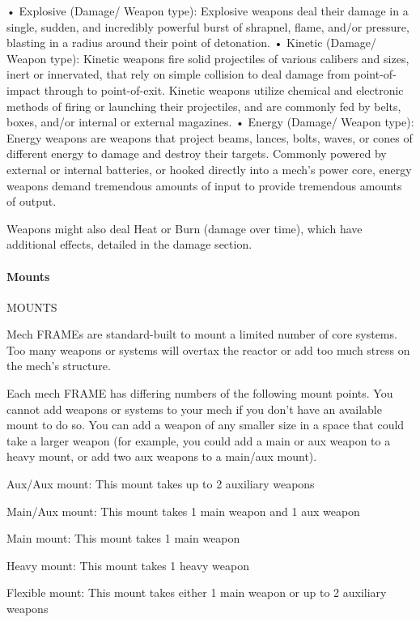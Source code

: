•  Explosive (Damage/ Weapon type): Explosive weapons deal their damage in a single,
  sudden, and incredibly powerful burst of shrapnel, flame, and/or pressure, blasting in a radius
  around their point of detonation.
•  Kinetic (Damage/ Weapon type): Kinetic weapons fire solid projectiles of various calibers and
  sizes, inert or innervated, that rely on simple collision to deal damage from point-of-impact
  through to point-of-exit. Kinetic weapons utilize chemical and electronic methods of firing or
  launching their projectiles, and are commonly fed by belts, boxes, and/or internal or external
  magazines.
•  Energy (Damage/ Weapon type): Energy weapons are weapons that project beams, lances,
  bolts, waves, or cones of different energy to damage and destroy their targets. Commonly
  powered by external or internal batteries, or hooked directly into a mech’s power core, energy
  weapons demand tremendous amounts of input to provide tremendous amounts of output.


Weapons might also deal Heat or Burn (damage over time), which have additional effects,
detailed in the damage section.
\paragraph{Mounts}
                                                 MOUNTS

Mech FRAMEs are standard-built to mount a limited number of core systems. Too many
weapons or systems will overtax the reactor or add too much stress on the mech’s structure.


Each mech FRAME has differing numbers of the following mount points. You cannot add
weapons or systems to your mech if you don’t have an available mount to do so. You can add a
weapon of any smaller size in a space that could take a larger weapon (for example, you could
add a main or aux weapon to a heavy mount, or add two aux weapons to a main/aux mount).


Aux/Aux mount: This mount takes up to 2 auxiliary weapons

Main/Aux mount: This mount takes 1 main weapon and 1 aux weapon

Main mount: This mount takes 1 main weapon

Heavy mount:  This mount takes 1 heavy weapon





Flexible mount: This mount takes either 1 main weapon or up to 2 auxiliary weapons


